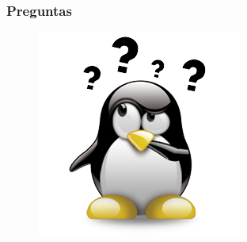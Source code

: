 \documentclass{beamer}
\begin{document}
\begin{frame}
\frametitle{Preguntas} 
\begin{figure}
\includegraphics[scale=0.9]{imagenes/dudas.png} 
\end{figure} 
\end{frame}
\end{document}

